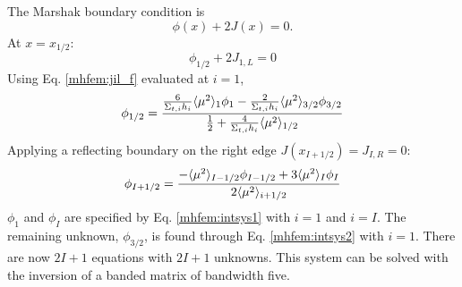 The Marshak boundary condition is 
	\begin{equation}
		\phi(x) + 2J(x) = 0. 
	\end{equation}
At $x = x_{1/2}$:
	\begin{equation}
		\phi_{1/2} + 2J_{1,L} = 0
	\end{equation}
Using Eq. \ref{mhfem:jil_f} evaluated at $i=1$, 
	\begin{equation}
		\phi_{1/2} = \frac{
			\frac{6}{\Sigma_{t,i}h_i} \langle \mu^2 \rangle_{1}\phi_{1} - \frac{2}{\Sigma_{t,i}h_i}\langle \mu^2 \rangle_{3/2}\phi_{3/2}
		}{
			\frac{1}{2} + \frac{4}{\Sigma_{t,i}h_i}\langle \mu^2 \rangle_{1/2}
		}
	\end{equation}
Applying a reflecting boundary on the right edge $J(x_{I+1/2}) = J_{I,R} = 0$:
	\begin{equation} 
		\phi_{I+1/2} = \frac{
			-\langle \mu^2 \rangle_{I-1/2}\phi_{I-1/2} + 3\langle \mu^2 \rangle_{I}\phi_{I}
		}{
			2\langle \mu^2 \rangle_{i+1/2}
		}
	\end{equation}
$\phi_1$ and $\phi_I$ are specified by Eq. \ref{mhfem:intsys1} with $i=1$ and $i=I$. The remaining unknown, $\phi_{3/2}$, is found through Eq. \ref{mhfem:intsys2} with $i=1$. 
There are now $2I+1$ equations with $2I+1$ unknowns. This system can be solved with the inversion of a banded matrix of bandwidth five. 